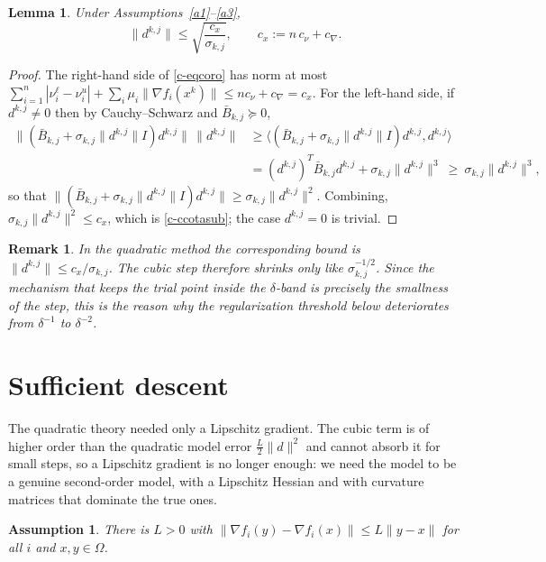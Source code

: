 \documentclass[11pt]{article}
\newcommand{\dkj}{d^{k,j}}
\newtheorem{lemma}[theorem]{Lemma}
\newtheorem{remark}[theorem]{Remark}
\newtheorem{assumption}{Assumption}
\begin{document}
\begin{lemma} \label{lem:c-step}
Under Assumptions~\ref{a1}--\ref{a3},
\begin{equation} \label{c-ccotasub}
\|\dkj\| \leq \sqrt{\frac{c_x}{\sigma_{k,j}}}, \qquad
c_x := n\,c_\nu + c_\nabla .
\end{equation}
\end{lemma}

\begin{proof}
The right-hand side of \eqref{c-eqcoro} has norm at most
$\sum_{i=1}^n |\nu^\ell_i - \nu^u_i| + \sum_i \mu_i\|\nabla f_i(x^k)\|
\leq n c_\nu + c_\nabla = c_x$. For the left-hand side, if $\dkj \neq 0$ then
by Cauchy--Schwarz and $\bar{B}_{k,j} \succeq 0$,
\begin{align*}
\big\|(\bar{B}_{k,j} + \sigma_{k,j}\|\dkj\| I)\dkj\big\|\,\|\dkj\|
&\geq \big\langle (\bar{B}_{k,j} + \sigma_{k,j}\|\dkj\| I)\dkj, \dkj
      \big\rangle \\
&= (\dkj)^T\bar{B}_{k,j}\dkj + \sigma_{k,j}\|\dkj\|^3
\ \geq\ \sigma_{k,j}\|\dkj\|^3 ,
\end{align*}
so that
$\|(\bar{B}_{k,j} + \sigma_{k,j}\|\dkj\| I)\dkj\| \geq \sigma_{k,j}\|\dkj\|^2$.
Combining, $\sigma_{k,j}\|\dkj\|^2 \leq c_x$, which is \eqref{c-ccotasub}; the
case $\dkj = 0$ is trivial.
\end{proof}

\begin{remark}
In the quadratic method the corresponding bound is $\|\dkj\| \leq
c_x/\sigma_{k,j}$. The cubic step therefore shrinks only like
$\sigma_{k,j}^{-1/2}$. Since the mechanism that keeps the trial point inside the
$\delta$-band is precisely the smallness of the step, this is the reason why
the regularization threshold below deteriorates from $\delta^{-1}$ to
$\delta^{-2}$.
\end{remark}

\section{Sufficient descent}

The quadratic theory needed only a Lipschitz gradient. The cubic term is of
higher order than the quadratic model error $\tfrac{L}{2}\|d\|^2$ and cannot
absorb it for small steps, so a Lipschitz gradient is no longer enough: we need
the model to be a genuine second-order model, with a Lipschitz Hessian and with
curvature matrices that dominate the true ones.

\begin{assumption} \label{a4}
There is $L > 0$ with
$\|\nabla f_i(y) - \nabla f_i(x)\| \leq L\|y-x\|$ for all $i$ and
$x,y \in \Omega$.
\end{assumption}
\end{document}
